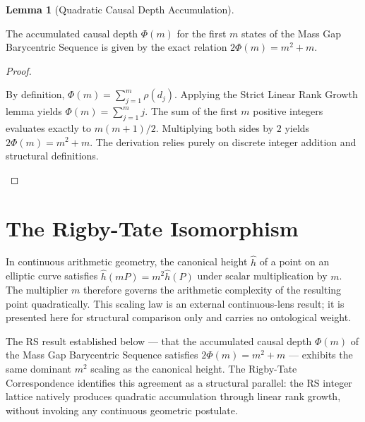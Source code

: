 \documentclass[11pt, letterpaper]{article}
\newcommand{\rank}{\rho}
\theoremstyle{definition}
\newtheorem{lemma}{Lemma}[section]
\begin{document}
\begin{lemma}[Quadratic Causal Depth Accumulation]
\begin{rsbox}
The accumulated causal depth $\Phi(m)$ for the first $m$ states of the Mass Gap Barycentric Sequence is given by the exact relation $2\Phi(m) = m^2 + m$.
\end{rsbox}
\begin{proof}
\begin{rsbox}
By definition, $\Phi(m) = \sum_{j=1}^{m} \rank(d_j)$.
Applying the Strict Linear Rank Growth lemma yields $\Phi(m) = \sum_{j=1}^{m} j$.
The sum of the first $m$ positive integers evaluates exactly to $m(m+1)/2$.
Multiplying both sides by $2$ yields $2\Phi(m) = m^2 + m$. The derivation relies purely on discrete integer addition and structural definitions.
\end{rsbox}
\end{proof}
\end{lemma}

\section{The Rigby-Tate Isomorphism}

\begin{verifybox}
In continuous arithmetic geometry, the canonical height $\hat{h}$ of a point on an elliptic curve satisfies $\hat{h}(mP) = m^2 \hat{h}(P)$ under scalar multiplication by $m$. The multiplier $m$ therefore governs the arithmetic complexity of the resulting point quadratically. This scaling law is an external continuous-lens result; it is presented here for structural comparison only and carries no ontological weight.
\end{verifybox}

\begin{observebox}
The RS result established below --- that the accumulated causal depth $\Phi(m)$ of the Mass Gap Barycentric Sequence satisfies $2\Phi(m) = m^2 + m$ --- exhibits the same dominant $m^2$ scaling as the canonical height. The Rigby-Tate Correspondence identifies this agreement as a structural parallel: the RS integer lattice natively produces quadratic accumulation through linear rank growth, without invoking any continuous geometric postulate.
\end{observebox}
\end{document}

